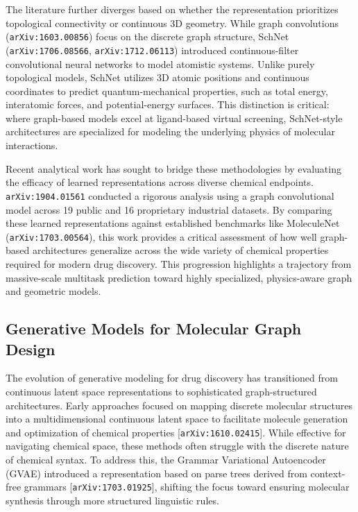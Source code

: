 \documentclass[11pt]{article}
\begin{document}
The literature further diverges based on whether the representation prioritizes topological connectivity or continuous 3D geometry. While graph convolutions (\texttt{arXiv:1603.00856}) focus on the discrete graph structure, SchNet (\texttt{arXiv:1706.08566}, \texttt{arXiv:1712.06113}) introduced continuous-filter convolutional neural networks to model atomistic systems. Unlike purely topological models, SchNet utilizes 3D atomic positions and continuous coordinates to predict quantum-mechanical properties, such as total energy, interatomic forces, and potential-energy surfaces. This distinction is critical: where graph-based models excel at ligand-based virtual screening, SchNet-style architectures are specialized for modeling the underlying physics of molecular interactions.

Recent analytical work has sought to bridge these methodologies by evaluating the efficacy of learned representations across diverse chemical endpoints. \texttt{arXiv:1904.01561} conducted a rigorous analysis using a graph convolutional model across 19 public and 16 proprietary industrial datasets. By comparing these learned representations against established benchmarks like MoleculeNet (\texttt{arXiv:1703.00564}), this work provides a critical assessment of how well graph-based architectures generalize across the wide variety of chemical properties required for modern drug discovery. This progression highlights a trajectory from massive-scale multitask prediction toward highly specialized, physics-aware graph and geometric models.

\subsection{Generative Models for Molecular Graph Design}

The evolution of generative modeling for drug discovery has transitioned from continuous latent space representations to sophisticated graph-structured architectures. Early approaches focused on mapping discrete molecular structures into a multidimensional continuous latent space to facilitate molecule generation and optimization of chemical properties [\texttt{arXiv:1610.02415}]. While effective for navigating chemical space, these methods often struggle with the discrete nature of chemical syntax. To address this, the Grammar Variational Autoencoder (GVAE) introduced a representation based on parse trees derived from context-free grammars [\texttt{arXiv:1703.01925}], shifting the focus toward ensuring molecular synthesis through more structured linguistic rules.
\end{document}
